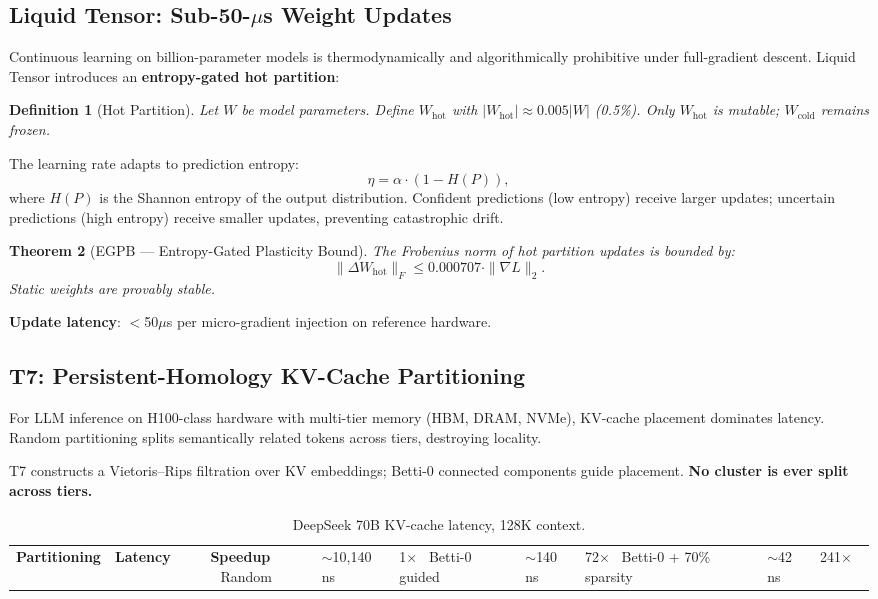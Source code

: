 \documentclass[11pt, a4paper]{article}
\theoremstyle{proofform}
\numberwithin{innerpoints}{subsection}
\numberwithin{disproof}{subsection}
\theoremstyle{mathproof}
\newtheorem{theorem}{Theorem}
\newtheorem{definition}[theorem]{Definition}
\begin{document}
\subsection{Liquid Tensor: Sub-50-$\mu$s Weight Updates}

Continuous learning on billion-parameter models is thermodynamically and algorithmically prohibitive under full-gradient descent. Liquid Tensor introduces an \textbf{entropy-gated hot partition}:

\begin{definition}[Hot Partition]
Let $W$ be model parameters. Define $W_{\text{hot}}$ with $|W_{\text{hot}}| \approx 0.005 |W|$ (0.5\%). Only $W_{\text{hot}}$ is mutable; $W_{\text{cold}}$ remains frozen.
\end{definition}

The learning rate adapts to prediction entropy:
\[
\eta = \alpha \cdot (1 - H(P)),
\]
where $H(P)$ is the Shannon entropy of the output distribution. Confident predictions (low entropy) receive larger updates; uncertain predictions (high entropy) receive smaller updates, preventing catastrophic drift.

\begin{theorem}[EGPB --- Entropy-Gated Plasticity Bound]
The Frobenius norm of hot partition updates is bounded by:
\[
\|\Delta W_{\text{hot}}\|_F \leq 0.000707 \cdot \|\nabla L\|_2.
\]
Static weights are provably stable.
\end{theorem}

\textbf{Update latency}: $<$50$\mu$s per micro-gradient injection on reference hardware.

\subsection{T7: Persistent-Homology KV-Cache Partitioning}

For LLM inference on H100-class hardware with multi-tier memory (HBM, DRAM, NVMe), KV-cache placement dominates latency. Random partitioning splits semantically related tokens across tiers, destroying locality.

T7 constructs a Vietoris--Rips filtration over KV embeddings; Betti-0 connected components guide placement. \textbf{No cluster is ever split across tiers.}

\begin{table}[h!]
\centering
\caption{DeepSeek 70B KV-cache latency, 128K context.}
\label{tab:kv}
\begin{tabular}{l|c|c}
\toprule
\textbf{Partitioning} & \textbf{Latency} & \textbf{Speedup} \
\midrule
Random & $\sim$10{,}140\,ns & 1$\times$ \
Betti-0 guided & $\sim$140\,ns & 72$\times$ \
Betti-0 + 70\% sparsity & $\sim$42\,ns & 241$\times$ \
\bottomrule
\end{tabular}
\end{table}
\end{document}
